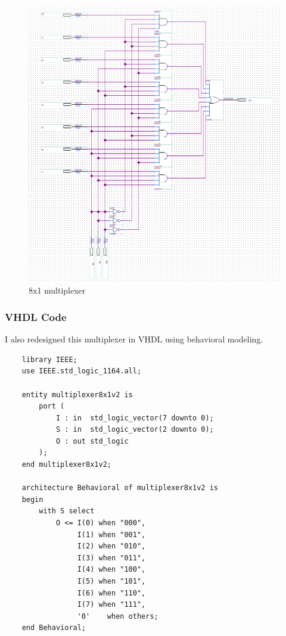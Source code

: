 \documentclass[12pt]{article}
\begin{document}
\begin{figure}[h]
\caption{8x1 multiplexer}
\centering
\includegraphics[width=\textwidth]{./diagrams/8x1multiplexer.png}
\end{figure}

\clearpage
\subsubsection{VHDL Code}
I also redesigned this multiplexer in VHDL using behavioral modeling.
\begin{verbatim}
    library IEEE;
    use IEEE.std_logic_1164.all;
    
    entity multiplexer8x1v2 is
        port (
            I : in  std_logic_vector(7 downto 0);
            S : in  std_logic_vector(2 downto 0);
            O : out std_logic
        );
    end multiplexer8x1v2;
    
    architecture Behavioral of multiplexer8x1v2 is
    begin
        with S select
            O <= I(0) when "000",
                 I(1) when "001",
                 I(2) when "010",
                 I(3) when "011",
                 I(4) when "100",
                 I(5) when "101",
                 I(6) when "110",
                 I(7) when "111",
                 '0'    when others;
    end Behavioral;
\end{verbatim}
\clearpage
\end{document}
